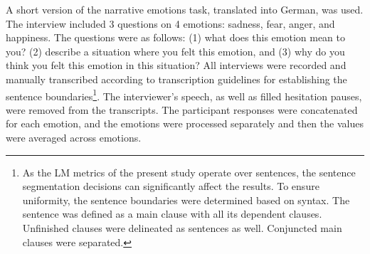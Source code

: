 A short version of the narrative emotions task, translated into German, was used. The interview included 3 questions on 4 emotions: sadness, fear, anger, and happiness. The questions were as follows: (1) what does this emotion mean to you? (2) describe a situation where you felt this emotion, and (3) why do you think you felt this emotion in this situation? All interviews were recorded and manually transcribed according to transcription guidelines for establishing the sentence boundaries\footnote{As the LM metrics of the present study operate over sentences, the sentence segmentation decisions can significantly affect the results. To ensure uniformity, the sentence boundaries were determined based on syntax. The sentence was defined as a main clause with all its dependent clauses. Unfinished clauses were delineated as sentences as well. Conjuncted main clauses were separated.}. The interviewer's speech, as well as filled hesitation pauses, were removed from the transcripts. The participant responses were concatenated for each emotion, and the emotions were processed separately and then the values were averaged across emotions. 



